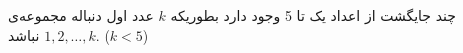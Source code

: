 چند جایگشت از اعداد یک تا 5 وجود دارد بطوریکه $k$ عدد اول دنباله مجموعه‌ی ${1, 2, \dots, k}$ نباشد. ($k < 5$)